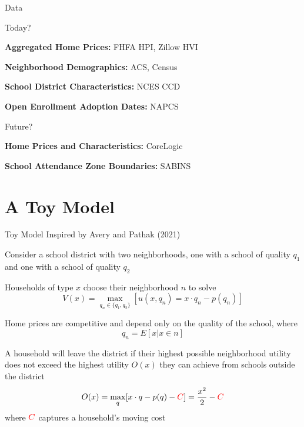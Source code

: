 \documentclass[notes,11pt, aspectratio=169]{beamer}
\newenvironment{wideitemize}{\itemize\addtolength{\itemsep}{10pt}}{\enditemize}
\begin{document}
\begin{frame}{Data}
\begin{wideitemize}
\item Today?
\begin{wideitemize}
\item \textbf{Aggregated Home Prices:} FHFA HPI, Zillow HVI
\item \textbf{Neighborhood Demographics:} ACS, Census
\item \textbf{School District Characteristics:} NCES CCD
\item \textbf{Open Enrollment Adoption Dates:} NAPCS
\end{wideitemize}
\item Future?
\begin{wideitemize}
  \item \textbf{Home Prices and Characteristics:} CoreLogic
  \item \textbf{School Attendance Zone Boundaries:} SABINS
\end{wideitemize}
\end{wideitemize}
\end{frame}

\section{A Toy Model}

\begin{frame}{Toy Model Inspired by Avery and Pathak (2021)}
\begin{wideitemize}
\item Consider a school district with two neighborhoods, one with a school of quality $q_1$ and one with a school of quality $q_2$
\item Households of type $x$ choose their neighborhood $n$ to solve \[V(x) = \max_{q_n \in \{q_1, q_2\}} [u(x, q_n) = x\cdot q_n - p(q_n)] \]
\item Home prices are competitive and depend only on the quality of the school, where \[q_n = E[x|x \in n]\]
\item A household will leave the district if their highest possible neighborhood utility does not exceed the highest utility $O(x)$ they can achieve from schools outside the district \[O(x) = \max_q [x\cdot q - p(q) - \textcolor{red}{C}] = \frac{x^2}{2} - \textcolor{red}{C}\]
where $\textcolor{red}{C}$ captures a household's moving cost

\end{wideitemize}
\end{frame}
\end{document}
